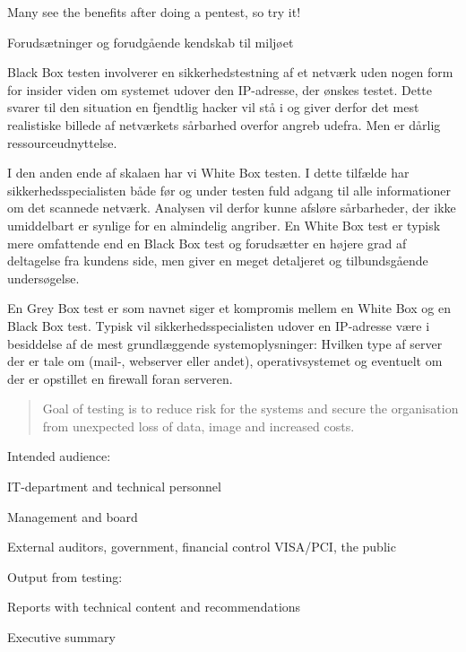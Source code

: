 \documentclass[Screen16to9,17pt]{foils}
\begin{document}
\vskip 2cm
\centerline{\Large Many see the benefits after doing a pentest, so try it!}


\begin{list2}
\item Forudsætninger og forudgående kendskab til miljøet
\item Black Box testen involverer en sikkerhedstestning af et netværk uden
nogen form for insider viden om systemet udover den IP-adresse, der
ønskes testet. Dette svarer til den situation en fjendtlig hacker vil
stå i og giver derfor det mest realistiske billede af netværkets
sårbarhed overfor angreb udefra. Men er dårlig ressourceudnyttelse.
\item I den anden ende  af skalaen har vi White Box testen. I dette tilfælde
har sikkerhedsspecialisten både før og under testen fuld adgang til
alle informationer om det scannede netværk. Analysen vil derfor kunne
afsløre sårbarheder, der ikke umiddelbart er synlige for en almindelig
angriber. En White Box test er typisk mere omfattende end en Black Box
test og forudsætter en højere grad af deltagelse fra kundens side, men
giver en meget detaljeret og tilbundsgående undersøgelse.

\item En Grey Box test er som navnet siger et kompromis mellem en White Box
og en Black Box test. Typisk vil sikkerhedsspecialisten udover en
IP-adresse være i besiddelse af de mest grundlæggende
systemoplysninger: Hvilken type af server der er tale om (mail-,
webserver eller andet), operativsystemet og eventuelt om der er
opstillet en firewall foran serveren.
\end{list2}



\begin{quote}
Goal of testing is to reduce risk for the systems and secure the organisation\\ from unexpected loss of data, image and increased costs.
\end{quote}

\begin{list1}
\item Intended audience:
\begin{list2}
\item IT-department and technical personnel
\item Management and board
\item External auditors, government, financial control VISA/PCI, the public
\end{list2}
\item Output from testing:
\begin{list2}
\item Reports with technical content and recommendations
\item Executive summary
\end{list2}
\end{list1}
\end{document}
